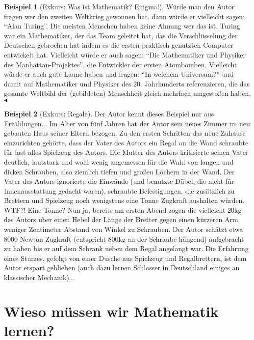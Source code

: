 \documentclass[a4paper]{book}%
\newcommand{\topicend}{
      $\blacktriangleleft$
}
\theoremstyle{definition}
\newtheorem{beispiel}{Beispiel}
\begin{document}
\begin{beispiel}[Exkurs: Was ist Mathematik? Enigma!]
    Würde man den Autor fragen wer den zweiten Weltkrieg gewonnen hat, dann würde er vielleicht sagen: \enquote{Alan Turing}. Die meisten Menschen haben keine Ahnung wer das ist. Turing war ein Mathematiker, der das Team geleitet hat, das die Verschlüsselung der Deutschen gebrochen hat indem es die ersten praktisch genutzten Computer entwickelt hat. Vielleicht würde er auch sagen: \enquote{Die Mathematiker und Physiker des Manhattan-Projektes}, die Entwickler der ersten Atombomben. Vielleicht würde er auch gute Laune haben und fragen: \enquote{In welchem Universum?} und damit auf Mathematiker und Physiker des 20. Jahrhunderts referenzieren, die das gesamte Weltbild der (gebildeten) Menschheit gleich mehrfach umgestoßen haben.\topicend
\end{beispiel}

\begin{beispiel}[Exkurs: Regale]
    Der Autor kennt dieses Beispiel nur aus Erzählungen... Im Alter von fünf Jahren hat der Autor sein neues Zimmer im neu gebauten Haus seiner Eltern bezogen. Zu den ersten Schritten das neue Zuhause einzurichten gehörte, dass der Vater des Autors ein Regal an die Wand schraubte für fast alles Spielzeug des Autors. Die Mutter des Autors kritisierte seinen Vater deutlich, lautstark und wohl wenig angemessen für die Wahl von langen und dicken Schrauben, also ziemlich tiefen und großen Löchern in der Wand. Der Vater des Autors ignorierte die Einwände (und benutzte Dübel, die nicht für Innenausstattung gedacht waren), schraubte Befestigungen, die zusätzlich zu Brettern und Spielzeug noch wenigstens eine Tonne Zugkraft aushalten würden. WTF?! Eine Tonne? Nun ja, bereits am ersten Abend zogen die vielleicht 20kg des Autors über einen Hebel der Länge der Bretter gegen einen kürzeren Arm weniger Zentimeter Abstand von Winkel zu Schrauben. Der Autor schätzt etwa 8000 Newton Zugkraft (entspricht 800kg an der Schraube hängend) aufgebracht zu haben bis er auf dem Schrank neben dem Regal angelangt war. Die Erfahrung eines Sturzes, gefolgt von einer Dusche aus Spielzeug und Regalbrettern, ist dem Autor erspart geblieben (auch dazu lernen Schlosser in Deutschland einiges an klassischer Mechanik)...
\end{beispiel}


\section{Wieso müssen wir Mathematik lernen?}\label{MathematikWieso}
\end{document}
